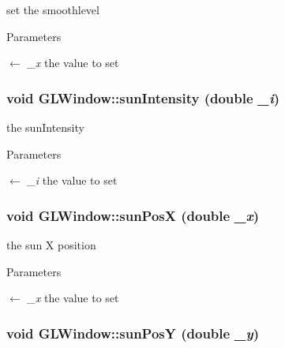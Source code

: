set the smoothlevel 
\begin{DoxyParams}{Parameters}
\item[\mbox{$\leftarrow$} {\em \_\-x}]the value to set \end{DoxyParams}
\hypertarget{classGLWindow_a4450d20ea4eb92fca33310ee1d1e6cbf}{
\subsubsection[{sunIntensity}]{\setlength{\rightskip}{0pt plus 5cm}void GLWindow::sunIntensity (double {\em \_\-i})}}
\label{classGLWindow_a4450d20ea4eb92fca33310ee1d1e6cbf}


the sunIntensity 
\begin{DoxyParams}{Parameters}
\item[\mbox{$\leftarrow$} {\em \_\-i}]the value to set \end{DoxyParams}
\hypertarget{classGLWindow_ac04a06844d575e15c9c4d367bec34721}{
\subsubsection[{sunPosX}]{\setlength{\rightskip}{0pt plus 5cm}void GLWindow::sunPosX (double {\em \_\-x})}}
\label{classGLWindow_ac04a06844d575e15c9c4d367bec34721}


the sun X position 
\begin{DoxyParams}{Parameters}
\item[\mbox{$\leftarrow$} {\em \_\-x}]the value to set \end{DoxyParams}
\hypertarget{classGLWindow_abd78e6478800ee61d631edbb85307019}{
\subsubsection[{sunPosY}]{\setlength{\rightskip}{0pt plus 5cm}void GLWindow::sunPosY (double {\em \_\-y})}}
\label{classGLWindow_abd78e6478800ee61d631edbb85307019}


